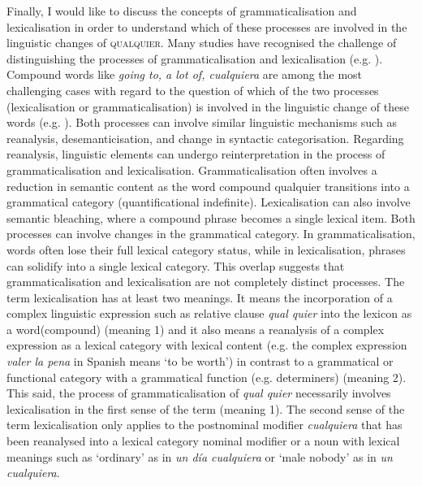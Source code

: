 Finally, I would like to discuss the concepts of grammaticalisation and lexicalisation in order to understand which of these processes are involved in the linguistic changes of \textsc{qualquier}. 
Many studies have recognised the challenge of distinguishing the processes of grammaticalisation and lexicalisation (e.g. \citealt{BrintonTraugott2005,diewald2012paradigmatic,Lehmann2002,traugott2013constructionalization,trousdale2012grammaticalization,van2015lexicalization}). Compound words like \textit{going to, a lot of, cualquiera} are among the most challenging cases with regard to the question of which of the two processes (lexicalisation or grammaticalisation) is involved in the linguistic change of these words (e.g. \citealt{BrintonTraugott2005,trousdale2012grammaticalization,van2015lexicalization}).  Both processes can involve similar linguistic mechanisms such as reanalysis, desemanticisation, and change in syntactic categorisation. Regarding reanalysis, linguistic elements can undergo reinterpretation in the process of grammaticalisation and lexicalisation. Grammaticalisation often involves a reduction in semantic content as the word compound qualquier transitions into a grammatical category (quantificational indefinite). Lexicalisation can also involve semantic bleaching, where a compound phrase becomes a single lexical item. Both processes can involve changes in the grammatical category. In grammaticalisation, words often lose their full lexical category status, while in lexicalisation, phrases can solidify into a single lexical category. This overlap suggests that grammaticalisation and lexicalisation are not completely distinct processes. The term lexicalisation has at least two meanings. It means the incorporation of a complex linguistic expression such as relative clause \textit {qual quier} into the lexicon as a word(compound) (meaning 1) and it also means a reanalysis of a complex expression as a lexical category with lexical content (e.g. the complex expression \textit {valer la pena} in Spanish means ‘to be worth’) in contrast to a grammatical or functional category with a grammatical function (e.g. determiners) (meaning 2). This said, the process of grammaticalisation of \textit {qual quier} necessarily involves lexicalisation in the first sense of the term (meaning 1). The second sense of the term lexicalisation only applies to the postnominal modifier \textit{cualquiera} that has been reanalysed into a lexical category nominal modifier or a noun with lexical meanings such as ‘ordinary’ as in \textit{un día cualquiera} or ‘male nobody’ as in \textit{un cualquiera}.      


